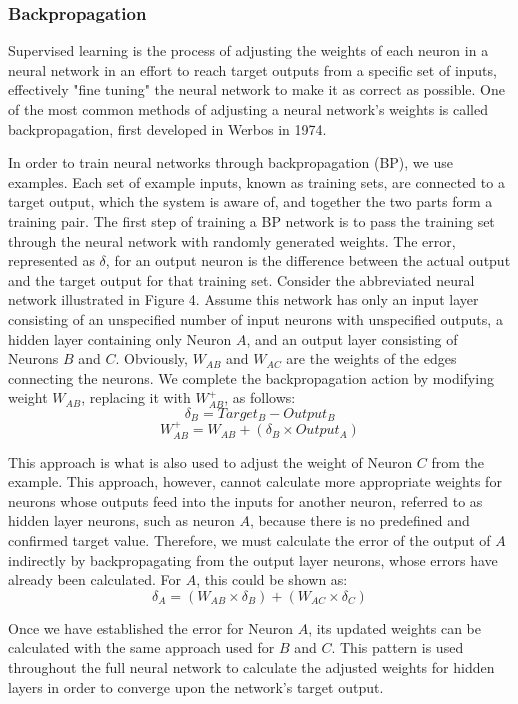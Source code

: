 \subsubsection{Backpropagation}
% 

Supervised learning is the process of adjusting the weights of each neuron in a neural network in an effort to reach target outputs from a specific set of inputs, effectively "fine tuning" the neural network to make it as correct as possible. One of the most common methods of adjusting a neural network's weights is called backpropagation, first developed in Werbos in 1974.

In order to train neural networks through backpropagation (BP), we use examples. Each set of example inputs, known as training sets, are connected to a target output, which the system is aware of, and together the two parts form a training pair. The first step of training a BP network is to pass the training set through the neural network with randomly generated weights. The error, represented as $\delta$, for an output neuron is the difference between the actual output and the target output for that training set. Consider the abbreviated neural network illustrated in Figure 4. Assume this network has only an input layer consisting of an unspecified number of input neurons with unspecified outputs, a hidden layer containing only Neuron $A$, and an output layer consisting of Neurons $B$ and $C$. Obviously, $W_{AB}$ and $W_{AC}$ are the weights of the edges connecting the neurons. We complete the backpropagation action by modifying weight $W_{AB}$, replacing it with $W^+_{AB}$, as follows:
$$\delta_B=Target_B-Output_B$$
$$W^+_{AB}=W_{AB}+(\delta_B\times Output_A)$$

This approach is what is also used to adjust the weight of Neuron $C$ from the example. This approach, however, cannot calculate more appropriate weights for neurons whose outputs feed into the inputs for another neuron, referred to as hidden layer neurons, such as neuron $A$, because there is no predefined and confirmed target value. Therefore, we must calculate the error of the output of $A$ indirectly by backpropagating from the output layer neurons, whose errors have already been calculated. For $A$, this could be shown as:
$$\delta_A = (W_{AB}\times\delta_B)+(W_{AC}\times\delta_C)$$

Once we have established the error for Neuron $A$, its updated weights can be calculated with the same approach used for $B$ and $C$. This pattern is used throughout the full neural network to calculate the adjusted weights for hidden layers in order to converge upon the network's target output.
 